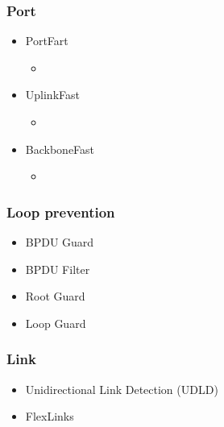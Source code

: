 \subsubsection{Port}

\begin{itemize}
	\item PortFart
    \begin{itemize}
        \item
    \end{itemize}
	\item UplinkFast
    \begin{itemize}
        \item
    \end{itemize}
	\item BackboneFast
    \begin{itemize}
        \item
    \end{itemize}
\end{itemize}

\subsubsection{Loop prevention}

\begin{itemize}
	\item BPDU Guard
	\item BPDU Filter
	\item Root Guard
	\item Loop Guard
\end{itemize}

\subsubsection{Link}

\begin{itemize}
	\item Unidirectional Link Detection (UDLD)
	\item FlexLinks
\end{itemize}
